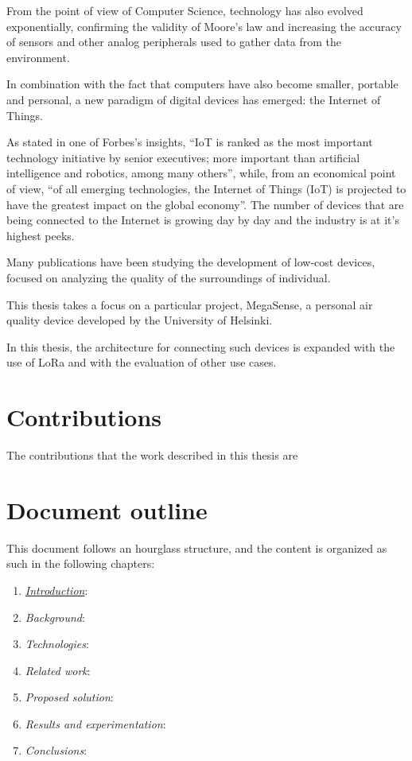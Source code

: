 	From the point of view of Computer Science, technology has also evolved exponentially, confirming the validity of Moore's law and increasing the accuracy of sensors and other analog peripherals used to gather data from the environment.

	In combination with the fact that computers have also become smaller, portable and personal, a new paradigm of digital devices has emerged: the Internet of Things.
		
	As stated in one of Forbes's insights, ``IoT is ranked as the most important technology initiative by senior executives; more important than artificial intelligence and robotics, among many others'', while, from an economical point of view, ``of all emerging technologies, the Internet of Things (IoT) is projected to have the greatest impact on the global economy''\cite{forbes}.
	The number of devices that are being connected to the Internet is growing day by day and the industry is at it's highest peeks.

	Many publications have been studying the development of low-cost devices, focused on analyzing the quality of the surroundings of individual. 

	This thesis takes a focus on a particular project, MegaSense, a personal air quality device developed by the University of Helsinki.
	
	In this thesis, the architecture for connecting such devices is expanded with the use of LoRa and with the evaluation of other use cases.
	
	\section{Contributions}\label{sec:contributions}
	
		The contributions that the work described in this thesis are
		
	
	\section{Document outline}\label{sec:document_outline}
		
		This document follows an hourglass structure, and the content is organized as such in the following chapters:
		
		\begin{enumerate}
			
			\item \hyperref[chapter:introduction]{\textit{Introduction}}:
			\item \textit{Background}:
			\item \textit{Technologies}:
			\item \textit{Related work}:
			\item \textit{Proposed solution}:
			\item \textit{Results and experimentation}:
			\item \textit{Conclusions}:
			
		\end{enumerate}
